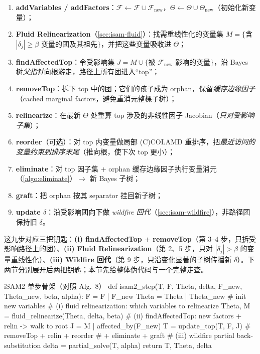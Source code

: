 \begin{algo}
\label{algo:isam2-step}
\begin{enumerate}
  \item \textbf{addVariables / addFactors}：$\mathcal{F}\leftarrow\mathcal{F}\cup\mathcal{F}_{\text{new}}$，$\Theta\leftarrow\Theta\cup\Theta_{\text{new}}$（初始化新变量）；
  \item \textbf{Fluid Relinearization}（\cref{sec:isam-fluid}）：找需重线性化的变量集 $M=\{$含 $|\delta_j|\ge\beta$ 变量的团及其祖先$\}$，并把这些变量吸收进 $\Theta$；
  \item \textbf{findAffectedTop}：令受影响集 $J=M\cup\{$被 $\mathcal{F}_{\text{new}}$ 影响的变量$\}$，沿 Bayes 树\emph{父指针}向根游走，路径上所有团进入“top”；
  \item \textbf{removeTop}：拆下 top 中的团；它们的孩子成为 orphan，保留\emph{缓存边缘因子}（cached marginal factors，避免重消元整棵子树）；
  \item \textbf{relinearize}：在最新 $\Theta$ 处重算 top 涉及的非线性因子 Jacobian（\emph{只对受影响子集}）；
  \item \textbf{reorder}（可选）：对 top 内变量做局部 (C)COLAMD 重排序，把\emph{最近访问的变量约束到排序末尾}（推向根，使下次 top 更小）；
  \item \textbf{eliminate}：对 top 因子集 $+$ orphan 缓存边缘因子执行变量消元（\cref{algo:eliminate}）$\to$ 新 Bayes 子树；
  \item \textbf{graft}：把 orphan 按其 separator 挂回新子树；
  \item \textbf{update $\delta$}：沿受影响团向下做 \emph{wildfire 回代}（\cref{sec:isam-wildfire}），非路径团保持旧 $\delta$。
\end{enumerate}
\end{algo}

\noindent 这九步对应三把钥匙：\textbf{(i) findAffectedTop $+$ removeTop}（第 3--4 步，只拆受影响路径上的团）、\textbf{(ii) Fluid Relinearization}（第 2、5 步，只对 $|\delta_j|>\beta$ 的变量重线性化）、\textbf{(iii) Wildfire 回代}（第 9 步，只沿变化显著的子树传播新 $\delta$）。下两节分别展开后两把钥匙；本节先给整体伪代码与一个完整走查。

\begin{codebox}[Python]{iSAM2 单步骨架（对照 Alg.~8）}
def isam2_step(T, F, Theta, delta, F_new, Theta_new, beta, alpha):
    F = F | F_new
    Theta = Theta | Theta_new                 # init new variables
    # (i) fluid relinearization: which variables to relinearize
    Theta, M = fluid_relinearize(Theta, delta, beta)
    # (ii) findAffectedTop: new factors + relin -> walk to root
    J = M | affected_by(F_new)
    T = update_top(T, F, J)                    # removeTop + relin + reorder
                                              #   + eliminate + graft
    # (iii) wildfire partial back-substitution
    delta = partial_solve(T, alpha)
    return T, Theta, delta
\end{codebox}

